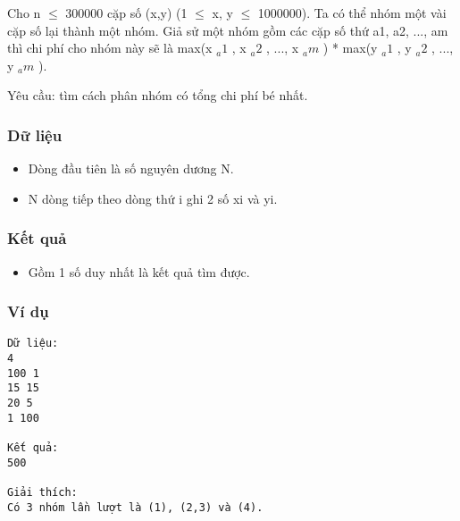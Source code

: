 



   Cho n $\le$ 300000 cặp số (x,y) (1 $\le$ x, y $\le$ 1000000). Ta có thể nhóm một vài cặp số lại thành một nhóm. Giả sử một nhóm gồm các cặp số thứ a1, a2, ..., am thì chi phí cho nhóm này sẽ là max(x   $_    a1   $   , x   $_    a2   $   , ..., x   $_    am   $   ) * max(y   $_    a1   $   , y   $_    a2   $   , ..., y   $_    am   $   ).  

   Yêu cầu: tìm cách phân nhóm có tổng chi phí bé nhất.  

\subsubsection{   Dữ liệu  }
\begin{itemize}
	\item     Dòng đầu tiên là số nguyên dương N.   
	\item     N dòng tiếp theo dòng thứ i ghi 2 số xi và yi.   
\end{itemize}

\subsubsection{   Kết quả  }
\begin{itemize}
	\item     Gồm 1 số duy nhất là kết quả tìm được.   
\end{itemize}

\subsubsection{   Ví dụ  }
\begin{verbatim}
Dữ liệu:
4
100 1
15 15
20 5
1 100

Kết quả:
500

Giải thích: 
Có 3 nhóm lần lượt là (1), (2,3) và (4). 

\end{verbatim}
